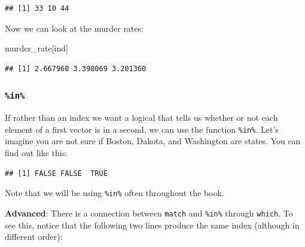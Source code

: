 \documentclass[
]{article}
\newenvironment{Shaded}{\begin{snugshade}}{\end{snugshade}}
\newcommand{\FunctionTok}[1]{\textcolor[rgb]{0.13,0.29,0.53}{\textbf{#1}}}
\newcommand{\NormalTok}[1]{#1}
\newcommand{\SpecialCharTok}[1]{\textcolor[rgb]{0.81,0.36,0.00}{\textbf{#1}}}
\newcommand{\StringTok}[1]{\textcolor[rgb]{0.31,0.60,0.02}{#1}}
\begin{document}
\begin{verbatim}
## [1] 33 10 44
\end{verbatim}

Now we can look at the murder rates:

\begin{Shaded}
\begin{Highlighting}[]
\NormalTok{murder\_rate[ind]}
\end{Highlighting}
\end{Shaded}

\begin{verbatim}
## [1] 2.667960 3.398069 3.201360
\end{verbatim}

\subsubsection{\texorpdfstring{\texttt{\%in\%}}{\%in\%}}\label{in}

If rather than an index we want a logical that tells us whether or not
each element of a first vector is in a second, we can use the function
\texttt{\%in\%}. Let's imagine you are not sure if Boston, Dakota, and
Washington are states. You can find out like this:

\begin{Shaded}
\end{Shaded}

\begin{verbatim}
## [1] FALSE FALSE  TRUE
\end{verbatim}

Note that we will be using \texttt{\%in\%} often throughout the book.

\textbf{Advanced}: There is a connection between \texttt{match} and
\texttt{\%in\%} through \texttt{which}. To see this, notice that the
following two lines produce the same index (although in different
order):

\begin{Shaded}
\end{Shaded}
\end{document}
